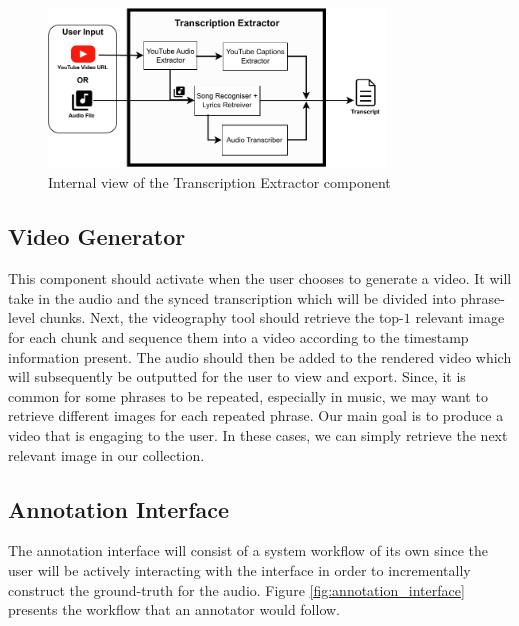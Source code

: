 \documentclass{l4proj}
\begin{document}
\begin{figure}
    \centering
    \includegraphics[width=0.8\textwidth]{figures/transcription_extractor.pdf}
    \caption{Internal view of the Transcription Extractor component}
    \label{fig:transcription_extractor}
\end{figure}

\subsection{Video Generator}
This component should activate when the user chooses to generate a video. It will take in the audio and the synced transcription which will be divided into phrase-level chunks. Next, the videography tool should retrieve the top-$1$ relevant image for each chunk and sequence them into a video according to the timestamp information present. The audio should then be added to the rendered video which will subsequently be outputted for the user to view and export. Since, it is common for some phrases to be repeated, especially in music, we may want to retrieve different images for each repeated phrase. Our main goal is to produce a video that is engaging to the user. In these cases, we can simply retrieve the next relevant image in our collection.

\subsection{Annotation Interface}
The annotation interface will consist of a system workflow of its own since the user will be actively interacting with the interface in order to incrementally construct the ground-truth for the audio. Figure \ref{fig:annotation_interface} presents the workflow that an annotator would follow.
\end{document}
